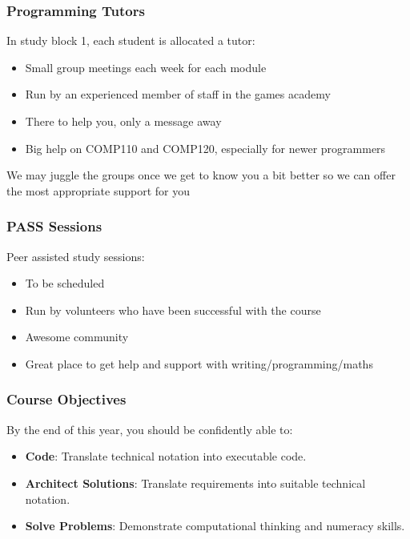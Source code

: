 \begin{frame}
	\frametitle{Programming Tutors}
	
	In study block 1, each student is allocated a tutor:
	
	\begin{itemize}
		\item Small group meetings each week for each module
		\item Run by an experienced member of staff in the games academy
		\item There to help you, only a message away
		\item Big help on COMP110 and COMP120, especially for newer programmers
	\end{itemize}
	
	\vspace{1em}
	
	We may juggle the groups once we get to know you a bit better so we can offer the most appropriate support for you
	
\end{frame}

\begin{frame}
	\frametitle{PASS Sessions}
	
	Peer assisted study sessions:
	
	\begin{itemize}
		\item To be scheduled
		\item Run by volunteers who have been successful with the course
		\item Awesome community
		\item Great place to get help and support with writing/programming/maths
	\end{itemize}
\end{frame}

\begin{frame}
	\frametitle{Course Objectives}
	
	By the end of this year, you should be confidently able to: \pause
	
	\begin{itemize}
		\item \textbf{Code}: Translate technical notation into executable code. \pause
		\item \textbf{Architect Solutions}: Translate requirements into suitable technical notation. \pause
		\item \textbf{Solve Problems}: Demonstrate computational thinking and numeracy skills.
	\end{itemize}
\end{frame}

